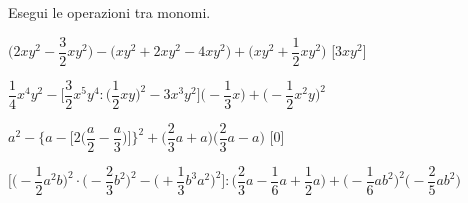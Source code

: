 \begin{esercizio}[\Ast]
 \label{ese:9.35}
Esegui le operazioni tra monomi.

\begin{enumeratea}
 \item 
\(\bigg(2xy^{2}-\dfrac{3}{2}xy^{2}\bigg)-\big(xy^{2}+2xy^{2}-4xy^{2}
\big)+\bigg(xy^{2}+\dfrac{1}{2}xy^{2}\bigg)\)
  \hfill[\(3xy^{2}\)]
 \item 
\(\dfrac{1}{4}x^{4}y^{2}-\bigg[\dfrac{3}{2}x^{5}y^{4}:\bigg(\dfrac{1}{2}xy\bigg)^
{2}-3x^{3}y^{2}\bigg]%
 \bigg(-{\dfrac{1}{3}}x\bigg)+\bigg(-{\dfrac{1}{2}}x^{2}y\bigg)^{2}\)
  \hfill{}
 \item 
\(a^{2}-\Bigg\{a-\bigg[2\bigg(\dfrac{a}{2}-\dfrac{a}{3}\bigg)\bigg]\Bigg\}^{2}+%
 \bigg(\dfrac{2}{3}a+a\bigg)\bigg(\dfrac{2}{3}a-a\bigg)\)
  \hfill[0]
 \item 
\(\bigg[\bigg(-{\dfrac{1}{2}}a^{2}b\bigg)^{2}\cdot\bigg(-{\dfrac{2}{3}}b^{2}
\bigg)^{2}-%
\bigg(+{\dfrac{1}{3}}b^{3}a^{2}\bigg)^{2}\bigg]:\bigg(\dfrac{2}{3}a-\dfrac{1}{6}
a+\dfrac{1}{2}a\bigg)+\bigg(-{\dfrac{1}{6}}ab^{2}\bigg)^2%
 \bigg(-{\dfrac{2}{5}}ab^2\bigg)\)
  \hfill{}%
%  
%  
%  
%  
\end{enumeratea}
\end{esercizio}


